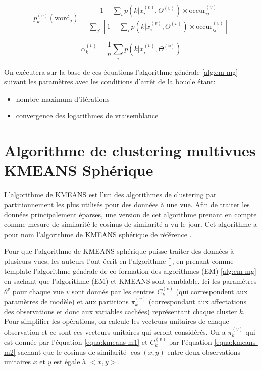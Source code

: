 \documentclass[12pt, french, latin.medieval, a4paper]{report}
\begin{document}
        \begin{equation}
            p_{k}^{(v)} (\text{word}_j) = \frac{ 1 + \sum_i p( k| x_{i}^{(v)} , \Theta^{(v)}) \times \text{occur}_{ij}^{(v)} }{ \sum_{j'} [ 1 + \sum_i p( k| x_{i}^{(v)} , \Theta^{(v)}) \times \text{occur}_{ij'}^{(v)} ] }
            \label{equa:em-ms4} 
        \end{equation}

        \begin{equation}
            \alpha_k^{(v)} = \frac{1}{n} \sum_i p( k| x_{i}^{(v)} , \Theta^{(v)})
            \label{equa:em-ms5} 
        \end{equation}

        On exécutera sur la base de ces équations l'algorithme générale \ref{alg:em-mg} suivant les paramètres avec les conditions d'arrêt de la boucle étant:
        \begin{itemize}
            \item nombre maximum d'itérations
            \item convergence des logarithmes de vraisemblance
        \end{itemize}

    \section{Algorithme de clustering multivues KMEANS Sphérique}
        L'algorithme de KMEANS est l'un des algorithmes de clustering par partitionnement les plus utilisés pour des données à une vue. Afin de traiter les données principalement éparses, une version de cet algorithme prenant en compte comme mesure de similarité le cosinus de similarité a vu le jour. Cet algorithme a pour nom l'algorithme de KMEANS sphérique de référence \cite{dhillon2001concept}.
        
        Pour que l'algorithme de KMEANS sphérique puisse traiter des données à plusieurs vues, les auteurs l'ont écrit en l'algorithme [], en prenant comme template l'algorithme générale de co-formation des algorithmes (EM) \ref{alg:em-mg} en sachant que l'algorithme (EM) et KMEANS sont semblable. Ici les paramètres $\theta^{v}$ pour chaque vue $v$ sont donnés par les centres $C_{k}^{(v)}$ (qui correspondent aux paramètres de modèle) et aux partitions $\pi_{k}^{(v)}$ (correspondant aux affectations des observations et donc aux variables cachées) représentant chaque cluster $k$. Pour simplifier les opérations, on calcule les vecteurs unitaires de chaque observation et ce sont ces vecteurs unitaires qui seront considérés. On a $\pi_{k}^{(v)}$ qui est donnée par l'équation \ref{equa:kmeans-m1} et $C_{k}^{(v)}$ par l'équation \ref{equa:kmeans-m2} sachant que le cosinus de similarité $\cos(x,y)$ entre deux observations unitaires $x$ et $y$ est égale à $<x , y>$.
    
\end{document}
